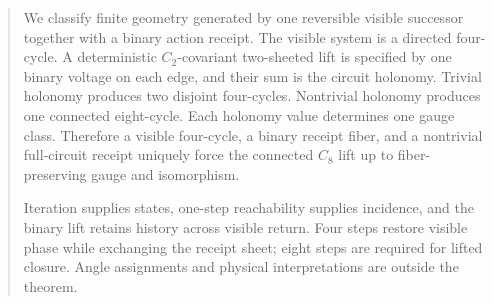 \begin{abstract}
We classify finite geometry generated by one reversible visible
successor together with a binary action receipt. The visible system is
a directed four-cycle. A deterministic \(C_2\)-covariant two-sheeted
lift is specified by one binary voltage on each edge, and their sum is
the circuit holonomy. Trivial holonomy produces two disjoint
four-cycles. Nontrivial holonomy produces one connected eight-cycle.
Each holonomy value determines one gauge class. Therefore a visible
four-cycle, a binary receipt fiber, and a nontrivial full-circuit
receipt uniquely force the connected \(C_8\) lift up to
fiber-preserving gauge and isomorphism.

Iteration supplies states, one-step reachability supplies incidence,
and the binary lift retains history across visible return. Four steps
restore visible phase while exchanging the receipt sheet; eight steps
are required for lifted closure. Angle assignments and physical
interpretations are outside the theorem.
\end{abstract}
